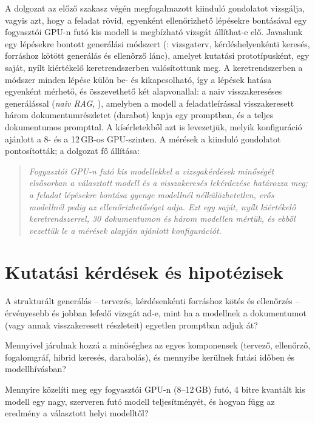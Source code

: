 A dolgozat az előző szakasz végén megfogalmazott kiinduló gondolatot vizsgálja, vagyis azt, hogy a
feladat rövid, egyenként ellenőrizhető lépésekre bontásával egy fogyasztói GPU-n futó kis modell is
megbízható vizsgát állíthat-e elő. Javaslunk egy lépésekre bontott generálási módszert (\Mimir{}:
vizsgaterv, kérdéshelyenkénti keresés, forráshoz kötött generálás és ellenőrző lánc), amelyet kutatási
prototípusként, egy saját, nyílt kiértékelő keretrendszerben valósítottunk meg. A keretrendszerben a módszer
minden lépése külön be- és kikapcsolható, így a lépések hatása egyenként mérhető, és összevethető két
alapvonallal: a naiv visszakereséses generálással (\emph{naiv RAG}, ), amelyben a modell a
feladatleírással visszakeresett három dokumentumrészletet (darabot) kapja egy promptban, és a teljes
dokumentumos prompttal. A kísérletekből azt is levezetjük, melyik konfiguráció ajánlott a 8- és a 12\,GB-os
GPU-szinten. A mérések a kiinduló gondolatot pontosították; a dolgozat fő állítása:

\begin{quote}
\itshape Fogyasztói GPU-n futó kis modellekkel a vizsgakérdések minőségét elsősorban a választott modell és a
visszakeresés lekérdezése határozza meg; a feladat lépésekre bontása gyenge modellnél nélkülözhetetlen, erős
modellnél pedig az ellenőrizhetőséget adja. Ezt egy saját, nyílt kiértékelő keretrendszerrel, 30 dokumentumon
és három modellen mértük, és ebből vezettük le a mérések alapján ajánlott konfigurációt.
\end{quote}

\section{Kutatási kérdések és hipotézisek}

\begin{description}[leftmargin=1.3cm,labelwidth=1.1cm,style=sameline,format=\normalfont\bfseries]
\item[RQ1] A strukturált generálás -- tervezés, kérdésenkénti forráshoz kötés és ellenőrzés -- érvényesebb és
jobban lefedő vizsgát ad-e, mint ha a modellnek a dokumentumot (vagy annak visszakeresett részleteit)
egyetlen promptban adjuk át?
\item[RQ2] Mennyivel járulnak hozzá a minőséghez az egyes komponensek (tervező, ellenőrző, fogalomgráf,
hibrid keresés, darabolás), és mennyibe kerülnek futási időben és modellhívásban?
\item[RQ3] Mennyire közelíti meg egy fogyasztói GPU-n (8--12\,GB) futó, 4 bitre kvantált kis modell egy nagy,
szerveren futó modell teljesítményét, és hogyan függ az eredmény a választott helyi modelltől?
\end{description}

